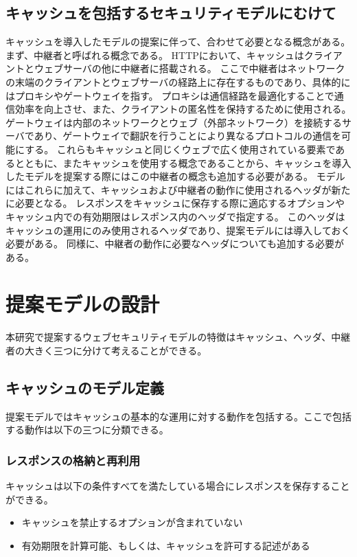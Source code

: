 \documentclass{css}
\begin{document}
\subsection{キャッシュを包括するセキュリティモデルにむけて}
キャッシュを導入したモデルの提案に伴って、合わせて必要となる概念がある。
まず、中継者と呼ばれる概念である。
HTTPにおいて、キャッシュはクライアントとウェブサーバの他に中継者に搭載される。
ここで中継者はネットワークの末端のクライアントとウェブサーバの経路上に存在するものであり、具体的にはプロキシやゲートウェイを指す。
プロキシは通信経路を最適化することで通信効率を向上させ、また、クライアントの匿名性を保持するために使用される。
ゲートウェイは内部のネットワークとウェブ（外部ネットワーク）を接続するサーバであり、ゲートウェイで翻訳を行うことにより異なるプロトコルの通信を可能にする。
これらもキャッシュと同じくウェブで広く使用されている要素であるとともに、またキャッシュを使用する概念であることから、キャッシュを導入したモデルを提案する際にはこの中継者の概念も追加する必要がある。
モデルにはこれらに加えて、キャッシュおよび中継者の動作に使用されるヘッダが新たに必要となる。
レスポンスをキャッシュに保存する際に適応するオプションやキャッシュ内での有効期限はレスポンス内のヘッダで指定する。
このヘッダはキャッシュの運用にのみ使用されるヘッダであり、提案モデルには導入しておく必要がある。
同様に、中継者の動作に必要なヘッダについても追加する必要がある。

\section{提案モデルの設計}
\label{sec:proposed}
本研究で提案するウェブセキュリティモデルの特徴はキャッシュ、ヘッダ、中継者の大きく三つに分けて考えることができる。

\subsection{キャッシュのモデル定義}
\label{cache}
提案モデルではキャッシュの基本的な運用に対する動作を包括する。ここで包括する動作は以下の三つに分類できる。

\subsubsection{レスポンスの格納と再利用}
\label{sec:store_reuse}
キャッシュは以下の条件すべてを満たしている場合にレスポンスを保存することができる。
\begin{itemize}
\item キャッシュを禁止するオプションが含まれていない
\item 有効期限を計算可能、もしくは、キャッシュを許可する記述がある
\end{itemize}
\end{document}
